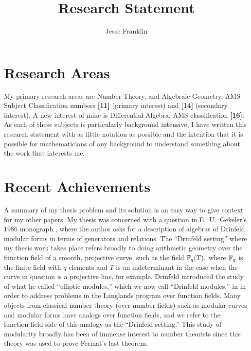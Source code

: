 \documentclass[12pt]{amsart}
\begin{document}
	\title{Research Statement}
	\author{Jesse Franklin}
	\maketitle
	
	\section{Research Areas}
	
	My primary research areas are Number Theory, and Algebraic Geometry, AMS Subject Classification numbers \textbf{[11]} (primary interest) and \textbf{[14]} (secondary interest). A new interest of mine is Differential Algebra, AMS classification \textbf{[16]}.\\
	
	As each of these subjects is particularly background intensive, I have written this research statement with as little notation as possible and the intention that it is possible for mathematicians of any background to understand something about the work that interests me.
	
	\section{Recent Achievements}
	
	A summary of my thesis problem and its solution is an easy way to give context for my other papers. My thesis was concerned with a question in E.\ U.\ Gekeler's $1986$ monograph \cite[Page $\mathrm{XIII}$]{Gekeler-Curves}, where the author asks for a description of algebras of Drinfeld modular forms in terms of generators and relations. The ``Drinfeld setting'' where my thesis work takes place refers broadly to doing arithmetic geometry over the function field of a smooth, projective curve, such as the field $\mathbb{ F }_q(T),$ where $\mathbb{ F }_q$ is the finite field with $q$ elements and $T$ is an indeterminant in the case when the curve in question is a projective line, for example. Drinfeld introduced the study of what he called ``elliptic modules,'' which we now call ``Drinfeld modules,'' in \cite{Drinfeld-elliptic-modules} in order to address problems in the Langlands program over function fields. Many objects from classical number theory (over number fields) such as modular curves and modular forms have analogs over function fields, and we refer to the function-field side of this analogy as the ``Drinfeld setting.'' This study of modularity broadly has been of immense interest to number theorists since this theory was used to prove Fermat's last theorem.\\
	
\end{document}
